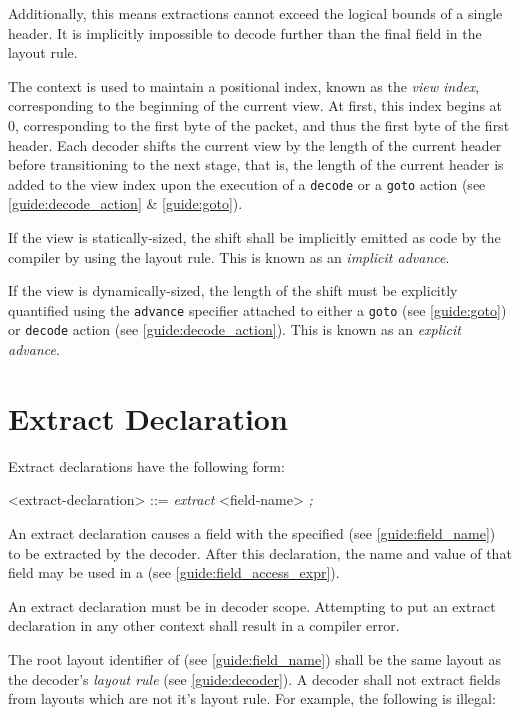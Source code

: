 Additionally, this means extractions cannot exceed the logical bounds of a single header. It is implicitly impossible to decode further than the final field in the layout rule.

The context is used to maintain a positional index, known as the \textit{view index}, corresponding to the beginning of the current view. At first, this index begins at 0, corresponding to the first byte of the packet, and thus the first byte of the first header. Each decoder shifts the current view by the length of the current header before transitioning to the next stage, that is, the length of the current header is added to the view index upon the execution of a \texttt{decode} or a \texttt{goto} action (see \ref{guide:decode_action} \& \ref{guide:goto}).

If the view is statically-sized, the shift shall be implicitly emitted as code by the compiler by using the layout rule. This is known as an \textit{implicit advance}.

If the view is dynamically-sized, the length of the shift must be explicitly quantified using the \texttt{\color{blue}advance} specifier attached to either a \texttt{goto} (see \ref{guide:goto}) or \texttt{decode} action (see \ref{guide:decode_action}). This is known as an \textit{explicit advance}.

\section{Extract Declaration} \label{guide:extract}

Extract declarations have the following form:

\begin{grammar}
<extract-declaration> ::=
\textit{extract} <field-name> \textit{;}
\end{grammar}

An extract declaration causes a field with the specified  (see \ref{guide:field_name}) to be extracted by the decoder. After this declaration, the name and value of that field may be used in a  (see \ref{guide:field_access_expr}).

An extract declaration must be in decoder scope. Attempting to put an extract declaration in any other context shall result in a compiler error.

The root layout identifier of  (see \ref{guide:field_name}) shall be the same layout as the decoder's \textit{layout rule} (see \ref{guide:decoder}). A decoder shall not extract fields from layouts which are not it's layout rule. For example, the following is illegal:

